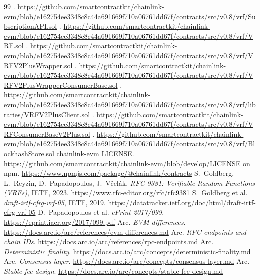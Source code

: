 \documentclass[11pt,a4paper]{article}
\begin{document}
\begin{thebibliography}{99}
 . \url{https://github.com/smartcontractkit/chainlink-evm/blob/e162754ee3348c8c44a691669f710a06761dd67f/contracts/src/v0.8/vrf/SubscriptionAPI.sol}
 . \url{https://github.com/smartcontractkit/chainlink-evm/blob/e162754ee3348c8c44a691669f710a06761dd67f/contracts/src/v0.8/vrf/VRF.sol}
 . \url{https://github.com/smartcontractkit/chainlink-evm/blob/e162754ee3348c8c44a691669f710a06761dd67f/contracts/src/v0.8/vrf/VRFV2PlusWrapper.sol}
 . \url{https://github.com/smartcontractkit/chainlink-evm/blob/e162754ee3348c8c44a691669f710a06761dd67f/contracts/src/v0.8/vrf/VRFV2PlusWrapperConsumerBase.sol}
 . \url{https://github.com/smartcontractkit/chainlink-evm/blob/e162754ee3348c8c44a691669f710a06761dd67f/contracts/src/v0.8/vrf/libraries/VRFV2PlusClient.sol}
 . \url{https://github.com/smartcontractkit/chainlink-evm/blob/e162754ee3348c8c44a691669f710a06761dd67f/contracts/src/v0.8/vrf/VRFConsumerBaseV2Plus.sol}
 . \url{https://github.com/smartcontractkit/chainlink-evm/blob/e162754ee3348c8c44a691669f710a06761dd67f/contracts/src/v0.8/vrf/BlockhashStore.sol}
 chainlink-evm LICENSE. \url{https://github.com/smartcontractkit/chainlink-evm/blob/develop/LICENSE}
  on npm. \url{https://www.npmjs.com/package/@chainlink/contracts}
 S.~Goldberg, L.~Reyzin, D.~Papadopoulos, J.~V\v{c}el\'ak. \emph{RFC 9381: Verifiable Random Functions (VRFs)}, IETF, 2023. \url{https://www.rfc-editor.org/rfc/rfc9381}
 S.~Goldberg et al. \emph{draft-irtf-cfrg-vrf-05}, IETF, 2019. \url{https://datatracker.ietf.org/doc/html/draft-irtf-cfrg-vrf-05}
 D.~Papadopoulos et al. \emph{ePrint 2017/099}. \url{https://eprint.iacr.org/2017/099.pdf}
 Arc. \emph{EVM differences}. \url{https://docs.arc.io/arc/references/evm-differences.md}
 Arc. \emph{RPC endpoints and chain IDs}. \url{https://docs.arc.io/arc/references/rpc-endpoints.md}
 Arc. \emph{Deterministic finality}. \url{https://docs.arc.io/arc/concepts/deterministic-finality.md}
 Arc. \emph{Consensus layer}. \url{https://docs.arc.io/arc/concepts/consensus-layer.md}
 Arc. \emph{Stable fee design}. \url{https://docs.arc.io/arc/concepts/stable-fee-design.md}

\end{thebibliography}
\end{document}
